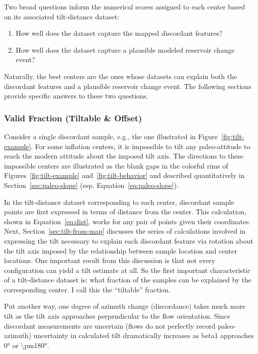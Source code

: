 Two broad questions inform the numerical scores assigned to each center based on its associated tilt-distance dataset:
\begin{enumerate}
    \item How well does the dataset capture the mapped discordant features?
    \item How well does the dataset capture a plausible modeled reservoir change event?
\end{enumerate}
Naturally, the best centers are the ones whose datasets can explain both the discordant features and a plausible reservoir change event. The following sections provide specific answers to these two questions. 

\subsubsection{Valid Fraction (Tiltable \& Offset)}\label{sec:valid-fraction}

Consider a single discordant sample, e.g., the one illustrated in Figure~\ref{fig:tilt-example}. For some inflation centers, it is impossible to tilt any paleo-attitude to reach the modern attitude about the imposed tilt axis. The directions to these impossible centers are illustrated as the blank gaps in the colorful rims of Figures~\ref{fig:tilt-example} and~\ref{fig:tilt-behavior} and described quantitatively in Section~\ref{sec:paleo-slope} (esp. Equation~\ref{eq:paleo-slope}).

In the tilt-distance dataset corresponding to each center, discordant sample points are first expressed in terms of distance from the center. This calculation, shown in Equation~\eqref{eq:dist}, works for any pair of points given their coordinates. Next, Section~\ref{sec:tilt-from-map} discusses the series of calculations involved in expressing the tilt necessary to explain each discordant feature via rotation about the tilt axis imposed by the relationship between sample location and center locations. One important result from this discussion is that not every configuration can yield a tilt estimate at all. So the first important characteristic of a tilt-distance dataset is: what fraction of the samples can be explained by the corresponding center. I call this the ``tiltable'' fraction.

Put another way, one degree of azimuth change (discordance) takes much more tilt as the tilt axis approaches perpendicular to the flow orientation. Since discordant measurements are uncertain (flows do not perfectly record paleo-azimuth) uncertainty in calculated tilt dramatically increases as \acs{beta1} approaches \ang{0} or \ang{\pm180}.

